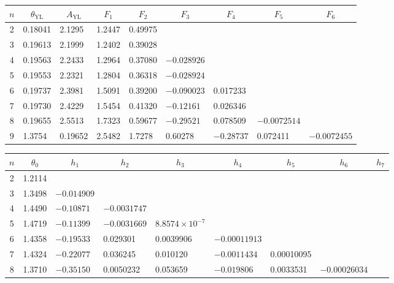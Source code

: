\documentclass[
  aps,
  pre,
  preprint,
  longbibliography,
  floatfix
]{revtex4-2}
\begin{document}
\begin{table}
  \singlespacing
  \begin{tabular}{c|llllllll}
    \multicolumn{1}{c|}{$n$} &
     \multicolumn{1}{c}{$\theta_\mathrm{YL}$} &
     \multicolumn{1}{c}{$A_\mathrm{YL}$} &
     \multicolumn{1}{c}{$F_1$} &
     \multicolumn{1}{c}{$F_2$} &
     \multicolumn{1}{c}{$F_3$} &
     \multicolumn{1}{c}{$F_4$} &
     \multicolumn{1}{c}{$F_5$} &
     \multicolumn{1}{c}{$F_6$} \\
    \hline
      2 &
      0.18041 &
      2.1295 &
      1.2447 &
      0.49975 \\
      3 &
      0.19613 &
      2.1999 &
      1.2402 &
      0.39028 \\
      4 &
      0.19563 &
      2.2433 &
      1.2964 &
      0.37080 &
      $-0.028926$ \\
      5 &
      0.19553 &
      2.2321 &
      1.2804 &
      0.36318 &
      $-0.028924$ & & \\
      6 &
      0.19737 &
      2.3981 &
      1.5091 &
      0.39200 &
      $-0.090023$ &
      0.017233 & \\
      7 &
      0.19730 &
      2.4229 &
      1.5454 &
      0.41320 &
      $-0.12161$ &
      0.026346 & \\
      8 &
      0.19655 & 
      2.5513 &
      1.7323 &
      0.59677 &
      $-0.29521$ &
      0.078509 &
      $-0.0072514$ \\
      9 &
      1.3754 &
      0.19652 &
      2.5482 &
      1.7278 &
      0.60278 &
      $-0.28737$ &
      0.072411 &
      $-0.0072455$ \\
      \hline
    \end{tabular}
    \begin{tabular}{c|llllllll}
        \hline
      $n$ &
        \multicolumn{1}{c}{$\theta_0$} & 
        \multicolumn{1}{c}{$h_1$} & 
        \multicolumn{1}{c}{$h_2$} & 
        \multicolumn{1}{c}{$h_3$} & 
        \multicolumn{1}{c}{$h_4$} & 
        \multicolumn{1}{c}{$h_5$} & 
        \multicolumn{1}{c}{$h_6$} & 
        \multicolumn{1}{c}{$h_7$} \\
      \hline
        2 &
        1.2114 \\
        3 &
      1.3498 &
      $-0.014909$ \\
      4 &
      1.4490 &
      $-0.10871$ & $-0.0031747$ \\
      5 &
      1.4719 &
      $-0.11399$ & $-0.0031669$ & $8.8574\times10^{-7}$ \\
      6 &
      1.4358 &
      $-0.19533$ & 0.029301 & 0.0039906 & $-0.00011913$ \\
      7 &
      1.4324 &
      $-0.22077$ & 0.036245 & 0.010120 & $-0.0011434$ & 0.00010095 \\
      8 &
      1.3710 & 
      $-0.35150$ & 0.0050232 & 0.053659 & $-0.019806$ & 0.0033531 & $-0.00026034$ \\
  \end{tabular}
\end{table}
\end{document}
